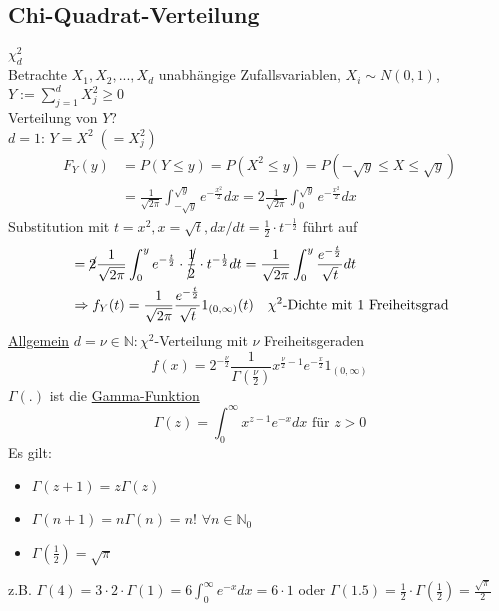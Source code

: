 \documentclass[a4paper,openany]{book}
\theoremstyle{mytheoremstyle}
\theoremstyle{mytheoremstyle2}
\begin{document}
\subsection{Chi-Quadrat-Verteilung} $\chi _d^2$ \\
Betrachte $X_1,X_2,...,X_d$ unabhängige Zufallsvariablen, $X_i\sim N(0,1)$, $Y:=\sum\limits_{j=1}^{d}{X_j^2}\geq 0$\\
Verteilung von $Y$?\\
\underline{$d=1$}: $Y=X^2\;(=X_j^2)$
\begin{align*}
  F_Y(y)&=P(Y \leq y)=P(X^2 \leq y)=P(-\sqrt{y}\leq X \leq \sqrt{y})\\
        &=\frac{1}{\sqrt{2 \pi }}\int_{-\sqrt{y}}^{\sqrt{y}}{e^{-\frac{x^2}{2}}dx}=2 \frac{1}{\sqrt{2 \pi }}\int_{0}^{\sqrt{y}}{e^{-\frac{x^2}{2}}dx} 
\end{align*}
Substitution mit $t=x^2,x=\sqrt{t},dx/dt=\frac{1}{2}\cdot t^{-\frac{1}{2}}$ führt auf
\begin{align*}
  &=\cancel{2} \frac{1}{\sqrt{2 \pi }}\int_{0}^{y}{e^{-\frac{t}{2}}}\cdot \cancel{\frac{1}{2}}\cdot t^{-\frac{1}{2}}dt=\frac{1}{\sqrt{2 \pi }}\int_{0}^{y}{\frac{e^{-\frac{t}{2}}}{\sqrt{t}}dt}\\
  &\Rightarrow f_Y(t)=\frac{1}{\sqrt{2 \pi }}\frac{e^{-\frac{t}{2}}}{\sqrt{t}}1_{(0,\infty )}(t)\quad \text{$\chi ^2$-Dichte mit 1 Freiheitsgrad}
\end{align*}
\underline{Allgemein} $d=\nu \in \mathbb{N}:\chi ^2$-Verteilung mit $\nu $ Freiheitsgeraden
\[
  f(x)=2^{-\frac{\nu }{2}}\frac{1}{\Gamma (\frac{\nu }{2})}x^{\frac{\nu }{2}-1}e^{-\frac{x}{2}}1_{(0,\infty)}
\]
$\Gamma(.)$ ist die \underline{Gamma-Funktion}
\[
  \Gamma(z)=\int_{0}^{\infty }{x^{z-1}e^{-x}dx} \text{ für } z>0
\]
Es gilt:
\begin{itemize}
  \item $\Gamma(z+1)=z\Gamma(z)$
  \item $\Gamma(n+1)=n\Gamma(n)=n!$ $\forall n \in \mathbb{N}_0$  
  \item $\Gamma(\frac{1}{2})=\sqrt{\pi }$ 
\end{itemize}
z.B. $\Gamma(4)=3 \cdot 2 \cdot \Gamma(1)=6 \int_{0}^{\infty}{e^{-x}dx}=6 \cdot 1$ oder 
$\Gamma(1.5)=\frac{1}{2}\cdot \Gamma(\frac{1}{2})=\frac{\sqrt{\pi }}{2}$ 
\begin{center}
\end{center}
\end{document}

